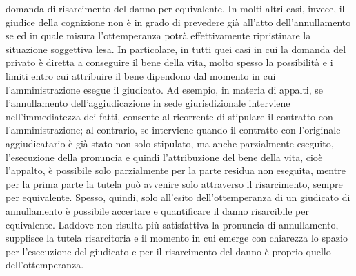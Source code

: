 \documentclass[12pt,it,a4paper,]{report}
\begin{document}
domanda di risarcimento del danno per equivalente. In molti altri casi,
invece, il giudice della cognizione non è in grado di prevedere già
all'atto dell'annullamento se ed in quale misura l'ottemperanza potrà
effettivamente ripristinare la situazione soggettiva lesa. In
particolare, in tutti quei casi in cui la domanda del privato è diretta
a conseguire il bene della vita, molto spesso la possibilità e i limiti
entro cui attribuire il bene dipendono dal momento in cui
l'amministrazione esegue il giudicato. Ad esempio, in materia di
appalti, se l'annullamento dell'aggiudicazione in sede giurisdizionale
interviene nell'immediatezza dei fatti, consente al ricorrente di
stipulare il contratto con l'amministrazione; al contrario, se
interviene quando il contratto con l'originale aggiudicatario è già
stato non solo stipulato, ma anche parzialmente eseguito, l'esecuzione
della pronuncia e quindi l'attribuzione del bene della vita, cioè
l'appalto, è possibile solo parzialmente per la parte residua non
eseguita, mentre per la prima parte la tutela può avvenire solo
attraverso il risarcimento, sempre per equivalente. Spesso, quindi, solo
all'esito dell'ottemperanza di un giudicato di annullamento è possibile
accertare e quantificare il danno risarcibile per equivalente. Laddove
non risulta più satisfattiva la pronuncia di annullamento, supplisce la
tutela risarcitoria e il momento in cui emerge con chiarezza lo spazio
per l'esecuzione del giudicato e per il risarcimento del danno è proprio
quello dell'ottemperanza.
\end{document}

